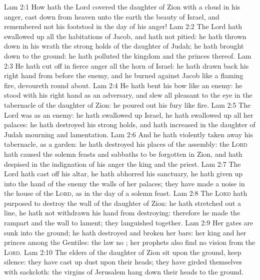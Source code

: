 \vs Lam 2:1 How hath the Lord covered the daughter of Zion with a cloud in his anger,  cast down from heaven unto the earth the beauty of Israel, and remembered not his footstool in the day of his anger!
\vs Lam 2:2 The Lord hath swallowed up all the habitations of Jacob, and hath not pitied: he hath thrown down in his wrath the strong holds of the daughter of Judah; he hath brought  down to the ground: he hath polluted the kingdom and the princes thereof.
\vs Lam 2:3 He hath cut off in  fierce anger all the horn of Israel: he hath drawn back his right hand from before the enemy, and he burned against Jacob like a flaming fire,  devoureth round about.
\vs Lam 2:4 He hath bent his bow like an enemy: he stood with his right hand as an adversary, and slew all  pleasant to the eye in the tabernacle of the daughter of Zion: he poured out his fury like fire.
\vs Lam 2:5 The Lord was as an enemy: he hath swallowed up Israel, he hath swallowed up all her palaces: he hath destroyed his strong holds, and hath increased in the daughter of Judah mourning and lamentation.
\vs Lam 2:6 And he hath violently taken away his tabernacle, as  a garden: he hath destroyed his places of the assembly: the \textsc{Lord} hath caused the solemn feasts and sabbaths to be forgotten in Zion, and hath despised in the indignation of his anger the king and the priest.
\vs Lam 2:7 The Lord hath cast off his altar, he hath abhorred his sanctuary, he hath given up into the hand of the enemy the walls of her palaces; they have made a noise in the house of the \textsc{Lord}, as in the day of a solemn feast.
\vs Lam 2:8 The \textsc{Lord} hath purposed to destroy the wall of the daughter of Zion: he hath stretched out a line, he hath not withdrawn his hand from destroying: therefore he made the rampart and the wall to lament; they languished together.
\vs Lam 2:9 Her gates are sunk into the ground; he hath destroyed and broken her bars: her king and her princes  among the Gentiles: the law  no ; her prophets also find no vision from the \textsc{Lord}.
\vs Lam 2:10 The elders of the daughter of Zion sit upon the ground,  keep silence: they have cast up dust upon their heads; they have girded themselves with sackcloth: the virgins of Jerusalem hang down their heads to the ground.
